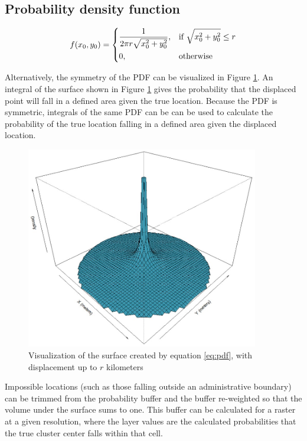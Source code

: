 \subsection{Probability density function}

    \begin{equation}
    \label{eq:pdf}
f(x_{0},y_{0}) = 
\begin{dcases}
\frac{1}{2\pi r\sqrt{x_{0}^{2}+y_{0}^{2}}}, & \text{if } \sqrt{x_{0}^2 + y_{0}^2} \leq r \\
0, & \text{otherwise}
\end{dcases}
\end{equation}

Alternatively, the symmetry of the PDF can be visualized in Figure \ref{fig:pdf_surface}. An integral of the surface shown in Figure \ref{fig:pdf_surface} gives the probability that the displaced point will fall in a defined area given the true location. Because the PDF is symmetric, integrals of the same PDF can be can be used to calculate the probability of the true location falling in a defined area given the displaced location.

    \begin{figure}[htbp]
        \centering
        \includegraphics[width=4in]{images/DensityPlot.jpg}
        \caption{Visualization of the surface created by equation \ref{eq:pdf}, with displacement up to $r$ kilometers}
        \label{fig:pdf_surface}
    \end{figure}

Impossible locations (such as those falling outside an administrative boundary) can be trimmed from the probability buffer and the buffer re-weighted so that the volume under the surface sums to one. This buffer can be calculated for a raster at a given resolution, where the layer values are the calculated probabilities that the true cluster center falls within that cell.

